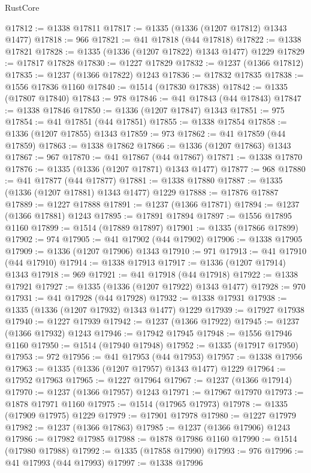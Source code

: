 \begin{lexlean}{RustCore}
\begin{coremodule}
@17812 := @1338 @17811
@17817 := @1335 (@1336 (@1207 @17812) @1343 @1477)
@17818 := 966
@17821 := @41 @17818 (@44 @17818)
@17822 := @1338 @17821
@17828 := @1335 (@1336 (@1207 @17822) @1343 @1477) @1229
@17829 := @17817 @17828
@17830 := @1227 @17829
@17832 := @1237 (@1366 @17812)
@17835 := @1237 (@1366 @17822) @1243
@17836 := @17832 @17835
@17838 := @1556 @17836 @1160
@17840 := @1514 (@17830 @17838)
@17842 := @1335 (@17807 @17840)
@17843 := 978
@17846 := @41 @17843 (@44 @17843)
@17847 := @1338 @17846
@17850 := @1336 (@1207 @17847) @1343
@17851 := 975
@17854 := @41 @17851 (@44 @17851)
@17855 := @1338 @17854
@17858 := @1336 (@1207 @17855) @1343
@17859 := 973
@17862 := @41 @17859 (@44 @17859)
@17863 := @1338 @17862
@17866 := @1336 (@1207 @17863) @1343
@17867 := 967
@17870 := @41 @17867 (@44 @17867)
@17871 := @1338 @17870
@17876 := @1335 (@1336 (@1207 @17871) @1343 @1477)
@17877 := 968
@17880 := @41 @17877 (@44 @17877)
@17881 := @1338 @17880
@17887 := @1335 (@1336 (@1207 @17881) @1343 @1477) @1229
@17888 := @17876 @17887
@17889 := @1227 @17888
@17891 := @1237 (@1366 @17871)
@17894 := @1237 (@1366 @17881) @1243
@17895 := @17891 @17894
@17897 := @1556 @17895 @1160
@17899 := @1514 (@17889 @17897)
@17901 := @1335 (@17866 @17899)
@17902 := 974
@17905 := @41 @17902 (@44 @17902)
@17906 := @1338 @17905
@17909 := @1336 (@1207 @17906) @1343
@17910 := 971
@17913 := @41 @17910 (@44 @17910)
@17914 := @1338 @17913
@17917 := @1336 (@1207 @17914) @1343
@17918 := 969
@17921 := @41 @17918 (@44 @17918)
@17922 := @1338 @17921
@17927 := @1335 (@1336 (@1207 @17922) @1343 @1477)
@17928 := 970
@17931 := @41 @17928 (@44 @17928)
@17932 := @1338 @17931
@17938 := @1335 (@1336 (@1207 @17932) @1343 @1477) @1229
@17939 := @17927 @17938
@17940 := @1227 @17939
@17942 := @1237 (@1366 @17922)
@17945 := @1237 (@1366 @17932) @1243
@17946 := @17942 @17945
@17948 := @1556 @17946 @1160
@17950 := @1514 (@17940 @17948)
@17952 := @1335 (@17917 @17950)
@17953 := 972
@17956 := @41 @17953 (@44 @17953)
@17957 := @1338 @17956
@17963 := @1335 (@1336 (@1207 @17957) @1343 @1477) @1229
@17964 := @17952 @17963
@17965 := @1227 @17964
@17967 := @1237 (@1366 @17914)
@17970 := @1237 (@1366 @17957) @1243
@17971 := @17967 @17970
@17973 := @1878 @17971 @1160
@17975 := @1514 (@17965 @17973)
@17978 := @1335 (@17909 @17975) @1229
@17979 := @17901 @17978
@17980 := @1227 @17979
@17982 := @1237 (@1366 @17863)
@17985 := @1237 (@1366 @17906) @1243
@17986 := @17982 @17985
@17988 := @1878 @17986 @1160
@17990 := @1514 (@17980 @17988)
@17992 := @1335 (@17858 @17990)
@17993 := 976
@17996 := @41 @17993 (@44 @17993)
@17997 := @1338 @17996

\end{coremodule}
\end{lexlean}
